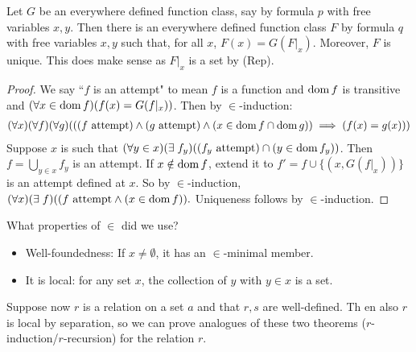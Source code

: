 \documentclass[10pt,a4paper]{article}
\begin{document}
\begin{theorem}
Let $G$ be an everywhere defined function class, say by formula $p$ with free variables $x,y$. Then there is an everywhere defined function class $F$ by formula $q$ with free variables $x,y$ such that, for all $x$, $F(x) = G(F|_x)$. Moreover, $F$ is unique. This does make sense as $F|_x$ is a set by (Rep). 
\end{theorem}
\begin{proof}
We say ``$f$ is an attempt" to mean $f$ is a function and $\operatorname{dom} f$ is transitive and $(\forall x \in \operatorname{dom} f)(f(x)=G(f|_x))$. Then by $\in$-induction:
\begin{align*}
(\forall x)(\forall f)(\forall g)(((f \text{ attempt})\wedge(g \text{ attempt})\wedge(x \in \operatorname{dom} f \cap \operatorname{dom} g))\implies (f(x)=g(x)))
\end{align*}
Suppose $x$ is such that $(\forall y \in x)(\exists f_y)((f_y\text{ attempt})\cap(y \in \dom f_y))$. Then $f = \bigcup_{y \in x}f_y$ is an attempt. If $x \notin \operatorname{dom} f$, extend it to $f' = f\cup\{(x, G(f|_x))\}$ is an attempt defined at $x$. So by $\in$-induction, $(\forall x)(\exists f)((f\text{ attempt}\wedge(x\in \dom f)).$ Uniqueness follows by $\in$-induction.
\end{proof}
What properties of $\in$ did we use?
\begin{itemize}
\item Well-foundedness: If $x \neq \emptyset$, it has an $\in$-minimal member.
\item It is local: for any set $x$, the collection of $y$ with $y \in x$ is a set.
\end{itemize}
Suppose now $r$ is a relation on a set $a$ and that $r,s$ are well-defined. Th en  also $r$ is local by separation, so we can prove analogues of these two theorems ($r$-induction/$r$-recursion) for the relation $r$.
\end{document}
